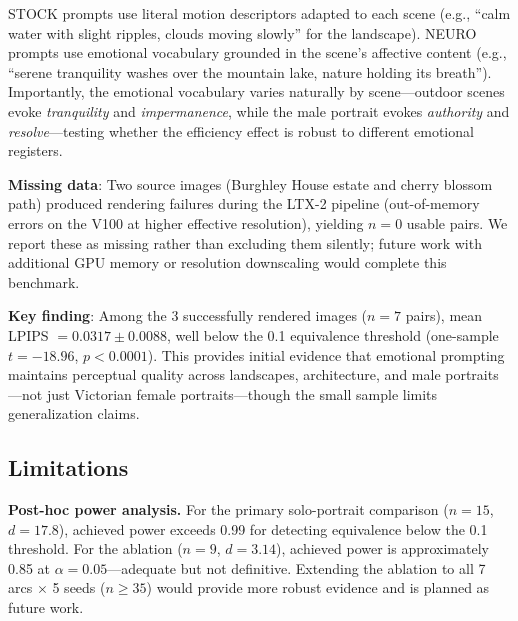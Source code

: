 \documentclass[10pt,twocolumn,letterpaper]{article}
\begin{document}
STOCK prompts use literal motion descriptors adapted to each scene (e.g., ``calm water with slight ripples, clouds moving slowly'' for the landscape). NEURO prompts use emotional vocabulary grounded in the scene's affective content (e.g., ``serene tranquility washes over the mountain lake, nature holding its breath''). Importantly, the emotional vocabulary varies naturally by scene---outdoor scenes evoke \textit{tranquility} and \textit{impermanence}, while the male portrait evokes \textit{authority} and \textit{resolve}---testing whether the efficiency effect is robust to different emotional registers.

\textbf{Missing data}: Two source images (Burghley House estate and cherry blossom path) produced rendering failures during the LTX-2 pipeline (out-of-memory errors on the V100 at higher effective resolution), yielding $n=0$ usable pairs. We report these as missing rather than excluding them silently; future work with additional GPU memory or resolution downscaling would complete this benchmark.

\textbf{Key finding}: Among the 3 successfully rendered images ($n = 7$ pairs), mean LPIPS $= 0.0317 \pm 0.0088$, well below the 0.1 equivalence threshold (one-sample $t = -18.96$, $p < 0.0001$). This provides initial evidence that emotional prompting maintains perceptual quality across landscapes, architecture, and male portraits---not just Victorian female portraits---though the small sample limits generalization claims.

\subsection{Limitations}
\label{sec:limitations}

\textbf{Post-hoc power analysis.} For the primary solo-portrait comparison ($n=15$, $d=17.8$), achieved power exceeds 0.99 for detecting equivalence below the 0.1 threshold. For the ablation ($n=9$, $d=3.14$), achieved power is approximately 0.85 at $\alpha=0.05$---adequate but not definitive. Extending the ablation to all 7 arcs $\times$ 5 seeds ($n \geq 35$) would provide more robust evidence and is planned as future work.
\end{document}
